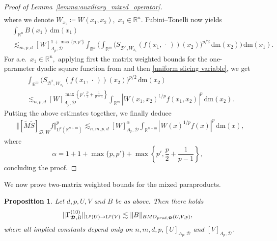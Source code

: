 \documentclass{article}
\newtheorem{proposition}[theorem]{Proposition}
\theoremstyle{definition}
\theoremstyle{remark}
\numberwithin{equation}{section}
\newcommand{\mathdm}{\,\mathrm{dm}}
\newcommand{\cD}{\mathcal{D}}
\newcommand{\bfD}{\bm{\mathcal{D}}}
\newcommand{\reals}{\mathbb{R}}
\newcommand{\Lp}[1]{\mathrm{L}^{#1}}
\newcommand{\1}{\mathbf{1}}
\newcommand{\var}{\,\cdot\,}
\begin{document}
\begin{proof}[Proof of Lemma~\ref{lemma:auxiliary_mixed_operator}]
\begin{align*}
        \end{align*}
        where we denote $W_{x_1}\coloneq W(x_1,x_2),$ $x_1\in\reals^n.$ Fubini--Tonelli now yields
        \begin{align*}
            &\int_{\reals^n}B(x_1)\mathdm(x_1)\\
            &\lesssim_{m,p,d}[W]_{A_p,\bfD}^{1+\max\{p,p'\}}\int_{\reals^n}\bigg(\int_{\reals^m}\bigg(S_{\cD^2,W_{x_1}}(f(x_1,\var))(x_2)\bigg)^{p/2}\mathdm(x_2)\bigg)\mathdm(x_1).
        \end{align*}
        For a.e.~$x_1\in\reals^n,$ applying first the matrix weighted bounds for the one-parameter dyadic square function from \cite{Isralowitz_2020} and then \eqref{uniform slicing variable}, we get
        \begin{align*}
            &\int_{\reals^m}\bigg(S_{\cD^2,W_{x_1}}(f(x_1,\var))(x_2)\bigg)^{p/2}\mathdm(x_2)\\
            &\lesssim_{n,p,d}[W]_{A_p,\bfD}^{\max\left\{p',\frac{p}{2}+\frac{1}{p-1}\right\}}\int_{\reals^m}|W(x_1,x_2)^{1/p}f(x_1,x_2)|^{p}\mathdm(x_2).
        \end{align*}
        Putting the above estimates together, we finally deduce
        \begin{align*}
             &\Vert [\widetilde{M}\widetilde{S}]_{\bfD,W}f\Vert_{\Lp{p}(\reals^{n+m})}^{p}
             \lesssim_{n,m,p,d}[W]_{A_p,\bfD}^{\alpha}\int_{\reals^{n+m}}|W(x)^{1/p}f(x)|^{p}\mathdm(x),
        \end{align*}
        where
        \begin{equation*}
            \alpha=1+1+\max\{p,p'\}+\max\left\{p',\frac{p}{2}+\frac{1}{p-1}\right\},
        \end{equation*}
        concluding the proof.
    \end{proof}

    We now prove two-matrix weighted bounds for the mixed paraproducts.

    \begin{proposition}
        \label{prop:mixedparaproducts}
        Let $d,p,U,V$ and $B$ be as above. Then there holds
        \begin{equation*}
            \Vert\Gamma_{\bfD,B}^{(10)}\Vert_{\Lp{p}(U)\rightarrow \Lp{p}(V)}\lesssim\Vert B\Vert_{\emph{BMO}_{\emph{prod},\bfD}(U,V,p)},
        \end{equation*}
        where all implied constants depend only on $n,m,d,p,[U]_{A_p,\bfD}$ and $[V]_{A_p,\bfD}.$
    \end{proposition}
\end{document}
